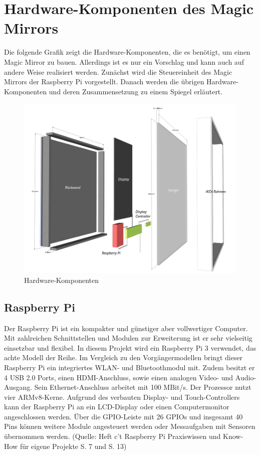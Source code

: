 \documentclass[12pt,a4paper]{report}
\begin{document}
\chapter{Hardware-Komponenten des Magic Mirrors}
Die folgende Grafik zeigt die Hardware-Komponenten, die es benötigt, um einen Magic Mirror zu bauen. Allerdings ist es nur ein Vorschlag und kann auch auf andere Weise realisiert werden. Zunächst wird die Steuereinheit des Magic Mirrors der Raspberry Pi vorgestellt. Danach werden die übrigen Hardware-Komponenten und deren Zusammensetzung zu einem Spiegel erläutert. 
\begin{figure}[h]
\hspace{-50pt}
\includegraphics[scale=.5]{Bauteile.png} 
\caption{Hardware-Komponenten}
\end{figure}
\section{Raspberry Pi}
Der Raspberry Pi ist ein kompakter und günstiger aber vollwertiger Computer. Mit zahlreichen Schnittstellen und Modulen zur Erweiterung ist er sehr vielseitig einsetzbar und flexibel. In diesem Projekt wird ein Raspberry Pi 3 verwendet, das achte Modell der Reihe. Im Vergleich zu den Vorgängermodellen bringt dieser Raspberry Pi ein integriertes WLAN- und Bluetoothmodul mit. Zudem besitzt er 4 USB 2.0 Ports, einen HDMI-Anschluss, sowie einen analogen Video- und Audio-Ausgang. Sein Ethernet-Anschluss arbeitet mit 100 MBit/s. Der Prozessor nutzt vier ARMv8-Kerne. Aufgrund des verbauten Display- und Touch-Controllers kann der Raspberry Pi an ein LCD-Display oder einen Computermonitor angeschlossen werden. Über die GPIO-Leiste mit 26 GPIOs und insgesamt 40 Pins können weitere Module angesteuert werden oder Messaufgaben mit Sensoren übernommen werden. (Quelle: Heft c't Raspberry Pi Praxiswissen und Know-How für eigene Projekte S. 7 und S. 13)
\end{document}
